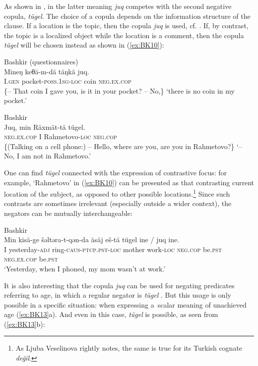 \documentclass[output=paper,draft,draftmode,colorlinks,citecolor=brown]{langscibook}
\begin{document}
As shown in \citet{mishchenko2017a}, in the latter meaning \textit{juq} competes with the second negative copula, \textit{tügel}. The choice of a copula depends on the information structure of the clause. If a location is the topic, then the copula \textit{juq} is used, cf. . If, by contrast, the topic is a localized object while the location is a comment, then the copula \textit{tügel} will be chosen instead as shown in (\ref{ex:BK10}):

\ea Bashkir (questionnaires) \label{ex:BK9}\\
	\gll Mineŋ		keθä-m-dä				täŋkä		juq.\\
	I.\textsc{gen}		pocket-\textsc{poss.1sg-loc}	coin		\textsc{neg.ex.cop}\\
	\glt \{– That coin I gave you, is it in your pocket? – No,\} `there is no coin in my pocket.'
\z

\ea Bashkir \citep[138]{mishchenko2017a} \label{ex:BK10}\\
	\gll Juq,			min	Räxmät-tä			tügel.\\
	\textsc{neg.ex.cop}	I		Rahmetovo-\textsc{loc}	\textsc{neg.cop}\\
	\glt \{(Talking on a cell phone:) – Hello, where are you, are you in Rahmetovo?\} `– No, I am not in Rahmetovo.'
\z


One can find \textit{tügel} connected with the expression of contrastive focus: for example, ‘Rahmetovo’ in (\ref{ex:BK10}) can be presented as that contrasting current location of the subject, as opposed to other possible locations.\footnote{As Ljuba Veselinova rightly notes, the same is true for its Turkish cognate \textit{değil}.} Since such contrasts are sometimes irrelevant (especially outside a wider context), the negators can be mutually interchangeable:

\ea Bashkir \citep[138]{mishchenko2017a} \label{ex:BK11}\\
	\gll Min	kisä-ge			šəltəra-t-qən-da			äsäj    eš-tä			tügel			ine		{/ juq}				ine.\\
	I		yesterday-\textsc{adj}	ring-\textsc{caus-ptcp.pst-loc}	mother  work-\textsc{loc}	\textsc{neg.cop}		be.\textsc{pst}	\textsc{neg.ex.cop}		be.\textsc{pst}\\
	\glt `Yesterday, when I phoned, my mom wasn’t at work.'
\z

It is also interesting that the copula \textit{juq} can be used for negating predicates referring to age, in which a regular negator is \textit{tügel} . But this usage is only possible in a specific situation: when expressing a scalar meaning of unachieved age (\ref{ex:BK13}a). And even in this case, \textit{tügel} is possible, as seen from (\ref{ex:BK13}b):
\end{document}
